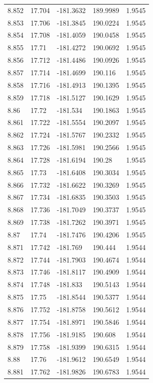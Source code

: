 \begin{tabular}{lllll}
8.852 & 17.704 & -181.3632 & 189.9989 & 1.9545 \\
8.853 & 17.706 & -181.3845 & 190.0224 & 1.9545 \\
8.854 & 17.708 & -181.4059 & 190.0458 & 1.9545 \\
8.855 & 17.71 & -181.4272 & 190.0692 & 1.9545 \\
8.856 & 17.712 & -181.4486 & 190.0926 & 1.9545 \\
8.857 & 17.714 & -181.4699 & 190.116 & 1.9545 \\
8.858 & 17.716 & -181.4913 & 190.1395 & 1.9545 \\
8.859 & 17.718 & -181.5127 & 190.1629 & 1.9545 \\
8.86 & 17.72 & -181.534 & 190.1863 & 1.9545 \\
8.861 & 17.722 & -181.5554 & 190.2097 & 1.9545 \\
8.862 & 17.724 & -181.5767 & 190.2332 & 1.9545 \\
8.863 & 17.726 & -181.5981 & 190.2566 & 1.9545 \\
8.864 & 17.728 & -181.6194 & 190.28 & 1.9545 \\
8.865 & 17.73 & -181.6408 & 190.3034 & 1.9545 \\
8.866 & 17.732 & -181.6622 & 190.3269 & 1.9545 \\
8.867 & 17.734 & -181.6835 & 190.3503 & 1.9545 \\
8.868 & 17.736 & -181.7049 & 190.3737 & 1.9545 \\
8.869 & 17.738 & -181.7262 & 190.3971 & 1.9545 \\
8.87 & 17.74 & -181.7476 & 190.4206 & 1.9545 \\
8.871 & 17.742 & -181.769 & 190.444 & 1.9544 \\
8.872 & 17.744 & -181.7903 & 190.4674 & 1.9544 \\
8.873 & 17.746 & -181.8117 & 190.4909 & 1.9544 \\
8.874 & 17.748 & -181.833 & 190.5143 & 1.9544 \\
8.875 & 17.75 & -181.8544 & 190.5377 & 1.9544 \\
8.876 & 17.752 & -181.8758 & 190.5612 & 1.9544 \\
8.877 & 17.754 & -181.8971 & 190.5846 & 1.9544 \\
8.878 & 17.756 & -181.9185 & 190.608 & 1.9544 \\
8.879 & 17.758 & -181.9399 & 190.6315 & 1.9544 \\
8.88 & 17.76 & -181.9612 & 190.6549 & 1.9544 \\
8.881 & 17.762 & -181.9826 & 190.6783 & 1.9544 \\

\end{tabular}
